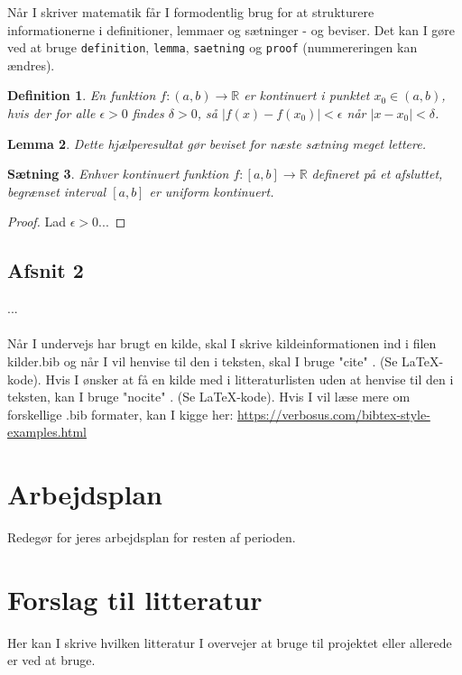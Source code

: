 \documentclass[10pt,reqno, usenames]{article}
\newtheorem{saetning}{Sætning}
\newtheorem{lemma}[saetning]{Lemma}
\newtheorem{definition}[saetning]{Definition}
\begin{document}
Når I skriver matematik får I formodentlig brug for at strukturere informationerne i definitioner, lemmaer og sætninger - og beviser. Det kan I gøre ved at bruge \verb|definition|, \verb|lemma|, \verb|saetning| og \verb|proof| (nummereringen kan ændres).

\begin{definition}
En funktion $f: (a,b) \to \mathbb R$ er \emph{kontinuert i punktet $x_0\in (a,b)$}, hvis der for alle $\epsilon>0$ findes $\delta>0$, så $|f(x)-f(x_0)|<\epsilon$ når $|x-x_0|<\delta$.
\end{definition}

\begin{lemma}
Dette hjælperesultat gør beviset for næste sætning meget lettere.
\end{lemma}

\begin{saetning}
Enhver kontinuert funktion $f: [a,b] \to \mathbb R$ defineret på et afsluttet, begrænset interval $[a,b]$ er uniform kontinuert.
\end{saetning}
\begin{proof}
Lad $\epsilon>0$...
\end{proof}

\subsection{Afsnit 2}
... \\ \\
Når I undervejs har brugt en kilde, skal I skrive kildeinformationen ind i filen kilder.bib og når I vil henvise til den i teksten,  skal I bruge "cite" \cite{bog1}. (Se LaTeX-kode). Hvis I ønsker at få en kilde med i litteraturlisten uden at henvise til den i teksten, kan I bruge "nocite" \nocite{hjemmseide1}. (Se LaTeX-kode).  Hvis I vil læse mere om forskellige .bib formater, kan I kigge her: \href{https://verbosus.com/bibtex-style-examples.html}{https://verbosus.com/bibtex-style-examples.html}

\section{Arbejdsplan}
Redegør for jeres arbejdsplan for resten af perioden.

\section{Forslag til litteratur}
Her kan I skrive hvilken litteratur I overvejer at bruge til projektet eller allerede er ved at bruge. 




\end{document}
